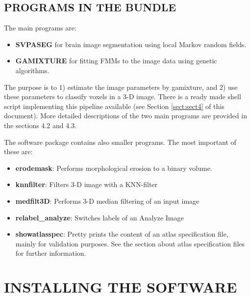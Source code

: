 \documentclass[12pt]{article}
\begin{document}
\subsection{PROGRAMS IN THE BUNDLE}

The main programs are:

\begin{itemize}

\item {\bf SVPASEG}  for brain image segmentation using local Markov random fields.

\item {\bf GAMIXTURE} for fitting FMMs to the image data using genetic
algorithms. 

\end{itemize}

The purpose is to 1) estimate the image parameters by gamixture, and
2) use these parameters to classify voxels in a 3-D image. There is a
ready made shell script implementing this pipeline available (see
Section \ref{sect:sect4} of this document). More detailed descriptions
of the two main programs are provided in the sections 4.2 and 4.3.  

The software package contains also smaller programs. The most
important of these are:

\begin{itemize}

\item {\bf erodemask}: Performs morphological erosion to a binary volume.

\item {\bf knnfilter}: Filters 3-D image with a KNN-filter

\item {\bf medfilt3D}: Performs 3-D median filtering of an input image

\item {\bf relabel\_analyze}: Switches labels of an Analyze Image

\item  {\bf showatlasspec}: Pretty prints the content of an atlas
specification file, mainly for validation purposes. See the section
about atlas specification files for further information.


\end{itemize}

\section{INSTALLING THE SOFTWARE}
\end{document}
